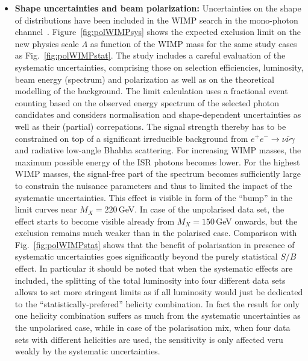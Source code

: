 \begin{itemize}
\item {\textbf{Shape uncertainties and beam polarization:}} Uncertainties on the shape of distributions have been included in the WIMP search in the mono-photon channel~\cite{Habermehl:417605}. Figure~\ref{fig:polWIMPsys} shows the expected exclusion limit on the new physics scale $\Lambda$ as function of the WIMP mass for the same study cases as Fig.~\ref{fig:polWIMPstat}. The study includes a careful evaluation of the systematic uncertainties, comprising those on selection efficiencies, luminosity, beam energy (spectrum) and polarization as well as on the theoretical modelling of the background. 
The limit calculation uses a fractional event counting based on the observed energy spectrum of the selected photon candidates and considers normalisation and shape-dependent uncertainties as well as their (partial) correpations. The signal strength thereby has to be constrained on top of a significant irreducible background from $e^+e^- \to \nu\bar{\nu}\gamma$ and radiative low-angle Bhabha scattering. For increasing WIMP masses, the maximum possible energy of the ISR photons becomes lower. For the highest WIMP masses, the signal-free part of the spectrum becomes sufficiently large to constrain the nuisance parameters and thus to limited the impact of the systematic uncertainties. This effect is visible in form of the ``bump'' in the limit curves near $M_X=220$\,GeV. In case of the unpolarised data set, the effect starts to become visible already from $M_X=150$\,GeV onwards,
but the exclusion remains much weaker than in the polarised case. Comparison with Fig.~\ref{fig:polWIMPstat} shows that the benefit of polarisation in presence of systematic uncertainties goes significantly beyond the purely statistical $S/B$ effect. In particular it should be noted that when the systematic effects are included, the splitting of the total luminosity into four different data sets allows to set more stringent limits as if all luminosity would just be dedicated to the ``statistically-prefered'' helicity combination. In fact the result for only one helicity combination suffers as much from the systematic uncertainties as the unpolarised case, while in case of the polarisation mix, when four data sets with different helicities are used, the sensitivity is only affected veru weakly by the systematic uncertainties.




\end{itemize}
